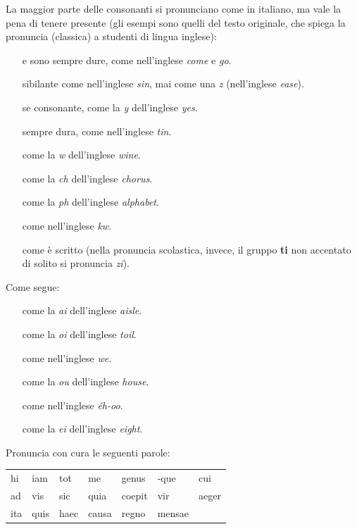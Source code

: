 \documentclass[nols]{tufte-handout}
\newcommand{\textls}[2][5]{%
    \begingroup\addfontfeatures{LetterSpace=#1}#2\endgroup
  }
\renewcommand{\smallcapsspacing}[1]{\textls[10]{#1}}
\renewcommand{\textsc}[1]{\smallcapsspacing{\textsmallcaps{#1}}}
\begin{document}
 La maggior parte delle consonanti si pronunciano come in italiano, ma vale la pena di tenere presente (gli esempi sono quelli del testo originale, che spiega la pronuncia (classica) a studenti di lingua inglese): 
\begin{itemize}
\item[\textsc{c} e \textsc{g}] sono sempre dure, come nell'inglese \textit{come} e \textit{go}.  
\item[\textsc{s}] sibilante come nell'inglese \textit{sin}, mai come una \textit{z} (nell'inglese \textit{ease}). 
\item[\textsc{i}] se consonante, come la \textit{y} dell'inglese \textit{yes}.  
\item[\textsc{t}] sempre dura, come nell'inglese \textit{tin}.  
\item[\textsc{v}] come la \textit{w} dell'inglese \textit{wine}.  
\item[\textsc{ch}] come la \textit{ch} dell'inglese \textit{chorus}.  
\item[\textsc{ph}] come la \textit{ph} dell'inglese \textit{alphabet}.  
\item[\textsc{qu}] come nell'inglese \textit{kw}. 
\item[\textsc{ti}] come è scritto (nella pronuncia scolastica, invece, il gruppo \textbf{ti} non accentato di solito si pronuncia \textit{zi}).  
\end{itemize} 

 Come segue: 
\begin{itemize}
\item[\textsc{ae}] come la \textit{ai} dell'inglese \textit{aisle}. 
\item[\textsc{oe}] come la \textit{oi} dell'inglese \textit{toil}. 
\item[\textsc{ui}] come nell'inglese \textit{we}.  
\item[\textsc{au}] come la \textit{ou} dell'inglese \textit{house}. 
\item[\textsc{eu}] come nell'inglese \textit{éh-oo}.  
\item[\textsc{ei}] come la \textit{ei} dell'inglese \textit{eight}.  
\end{itemize} 



 Pronuncia con cura le seguenti parole:
\begin{fullwidth}
\begin{table}[!htbp]
  \centering
  \begin{tabular}{l l l l l l l}
	hi & iam & tot & me & genus & -que & cui \\
	ad & vis & sic & quia & coepit & vir & aeger \\
	ita & quis & haec & causa & regno & mensae & \\
  \end{tabular}
  \label{tab:normaltab}
\end{table}
\end{fullwidth}
\end{document}
